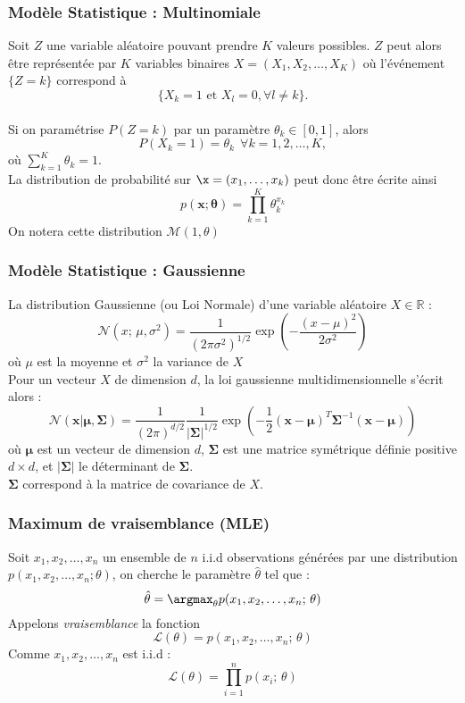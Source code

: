 \begin{frame}
  \frametitle{Modèle Statistique : Multinomiale}
    Soit $Z$ une variable aléatoire pouvant prendre $K$ valeurs possibles. $Z$ peut alors être représentée par $K$ variables binaires $X=(X_1,X_2,\ldots,X_K)$ où l'événement $\{Z=k\}$ correspond à $$\{X_k=1 \text{ et } X_l=0, \forall l \neq k\}.$$ \\
    Si on paramétrise $P(Z=k)$ par un paramètre $\theta_k \in [0,1]$, alors 
    $$P(X_k=1) = \theta_k \ \ \forall k=1,2,\ldots,K,$$
    où $\sum_{k=1}^K \theta_k=1$. \\
    La distribution de probabilité sur $\x=(x_1,\ldots, x_k)$ peut donc être écrite ainsi
    $$p(\mathbf{x};\bm{\theta})=\prod_{k=1}^K\theta_k^{x_k}$$
    On notera cette distribution $\mathcal{M}(1,\theta)$ 
\end{frame}

\begin{frame}
  \frametitle{Modèle Statistique : Gaussienne}
  La distribution Gaussienne (ou Loi Normale) d'une variable aléatoire $X \in \mathbb{R}$ :
    \[
    \mathcal{N}(x; \, \mu,\sigma^2)=\frac{1}{(2\pi\sigma^2)^{1/2}}\exp\left(-\frac{(x-\mu)^2}{2\sigma^2}\right)
    \]
    où $\mu$ est la moyenne et $\sigma^2$ la variance de $X$ \\
    \newline
    Pour un vecteur $X$ de dimension $d$, la loi gaussienne multidimensionnelle s'écrit alors :
    \[
    \mathcal{N}(\mathbf{x}|\bm{\mu},\bm{\Sigma})=\frac{1}{(2\pi)^{d/2}}\frac{1}{|\bm{\Sigma}|^{1/2}}\exp\left(-\frac{1}{2}(\mathbf{x}-\bm{\mu})^T\bm{\Sigma}^{-1}(\mathbf{x}-\bm{\mu})\right)
    \]
    où $\bm{\mu}$ est un vecteur de dimension $d$, $\bm{\Sigma}$ est une matrice symétrique définie positive $d\times d$, et $|\bm{\Sigma}|$ le déterminant de $\bm{\Sigma}$. \\
    $\bm{\Sigma}$ correspond à la matrice de covariance de $X$.
\end{frame}

\begin{frame}
  \frametitle{Maximum de vraisemblance (MLE)}
  Soit $x_1,x_2,\ldots,x_n$ un ensemble de $n$ i.i.d observations générées par une distribution $p(x_1,x_2,\ldots,x_n;\theta)$, on cherche le paramètre $\hat{\theta}$ tel que :
  $$\hat{\theta} = \argmax_\theta p(x_1,x_2,\ldots,x_n; \, \theta)$$
  Appelons \textit{vraisemblance} la fonction
  $$\mathcal{L}(\theta) = p(x_1,x_2,\ldots,x_n; \, \theta)$$
  Comme $x_1,x_2,\ldots,x_n$ est i.i.d :
  $$\mathcal{L}(\theta) = \prod_{i=1}^n p(x_i; \, \theta)$$
\end{frame}

